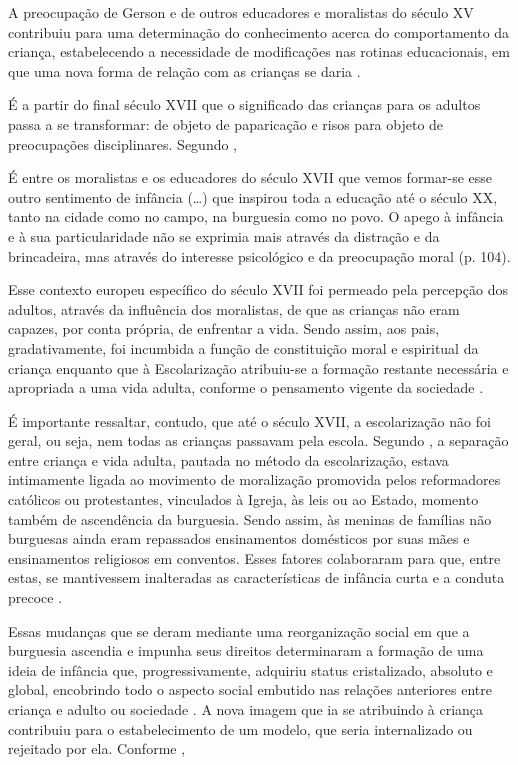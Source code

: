 A preocupação de Gerson e de outros educadores e moralistas do século XV contribuiu para uma determinação do conhecimento acerca do comportamento da criança, estabelecendo a necessidade de modificações nas rotinas educacionais, em que uma nova forma de relação com as crianças se daria \cite{ARIES2011}.

É a partir do final século XVII que o significado das crianças para os adultos passa a se transformar: de objeto de paparicação e risos para objeto de preocupações disciplinares. Segundo ,

\begin{citacao}
	É entre os moralistas e os educadores do século XVII que vemos formar-se esse outro sentimento de infância (…) que inspirou toda a educação até o século XX, tanto na cidade como no campo, na burguesia como no povo. O apego à infância e à sua particularidade não se exprimia mais através da distração e da brincadeira, mas através do interesse psicológico e da preocupação moral (p. 104).
\end{citacao}

Esse contexto europeu específico do século XVII foi permeado pela percepção dos adultos, através da influência dos moralistas, de que as crianças não eram capazes, por conta própria, de enfrentar a vida. Sendo assim, aos pais, gradativamente, foi incumbida a função de constituição moral e espiritual da criança enquanto que à Escolarização atribuiu-se a formação restante necessária e apropriada a uma vida adulta, conforme o pensamento vigente da sociedade \cite{MIRANDA1989}.  

É importante ressaltar, contudo, que até o século XVII, a escolarização não foi geral, ou seja, nem todas as crianças passavam pela escola. Segundo , a separação entre criança e vida adulta, pautada no método da escolarização, estava intimamente ligada ao movimento de moralização promovida pelos reformadores católicos ou protestantes, vinculados à Igreja, às leis ou ao Estado, momento também de ascendência da burguesia. Sendo assim, às meninas de famílias não burguesas ainda eram repassados ensinamentos domésticos por suas mães e ensinamentos religiosos em conventos. Esses fatores colaboraram para que, entre estas, se mantivessem inalteradas as características de infância curta e a conduta precoce \cite{ARIES2011}. 

Essas mudanças que se deram mediante uma reorganização social em que a burguesia ascendia e impunha seus direitos determinaram a formação de uma ideia de infância que, progressivamente, adquiriu status cristalizado, absoluto e global, encobrindo todo o aspecto social embutido nas relações anteriores entre criança e adulto ou sociedade \cite{MIRANDA1989}. A nova imagem que ia se atribuindo à criança contribuiu para o estabelecimento de um modelo, que seria internalizado ou rejeitado por ela. Conforme , 

